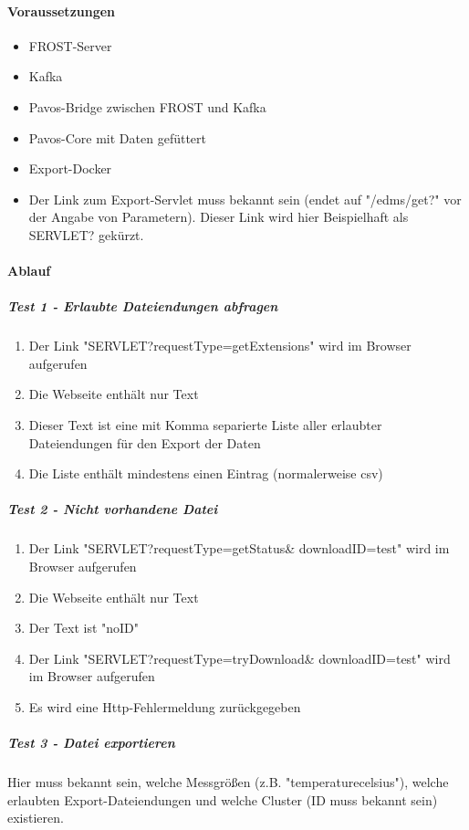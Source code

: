 \documentclass{article}
\begin{document}
\paragraph{Voraussetzungen}
\begin{itemize}
\item FROST-Server
\item Kafka
\item Pavos-Bridge zwischen FROST und Kafka
\item Pavos-Core mit Daten gefüttert
\item Export-Docker
\item Der Link zum Export-Servlet muss bekannt sein (endet auf "/edms/get?" vor der Angabe von Parametern). Dieser Link wird hier Beispielhaft als SERVLET? gekürzt.
\end{itemize}
\paragraph{Ablauf}
\subparagraph{Test 1 - Erlaubte Dateiendungen abfragen}
\begin{enumerate}
\item Der Link "SERVLET?requestType=getExtensions" wird im Browser aufgerufen
\item Die Webseite enthält nur Text
\item Dieser Text ist eine mit Komma separierte Liste aller erlaubter Dateiendungen für den Export der Daten
\item Die Liste enthält mindestens einen Eintrag (normalerweise csv)
\end{enumerate}
\subparagraph{Test 2 - Nicht vorhandene Datei}
\begin{enumerate}
\item Der Link "SERVLET?requestType=getStatus\& downloadID=test" wird im Browser aufgerufen
\item Die Webseite enthält nur Text
\item Der Text ist "noID"
\item Der Link "SERVLET?requestType=tryDownload\& downloadID=test" wird im Browser aufgerufen
\item Es wird eine Http-Fehlermeldung zurückgegeben
\end{enumerate}
\subparagraph{Test 3 - Datei exportieren}
Hier muss bekannt sein, welche Messgrößen (z.B. "temperature\textunderscore celsius"), welche erlaubten Export-Dateiendungen und welche Cluster (ID muss bekannt sein) existieren.
\end{document}
